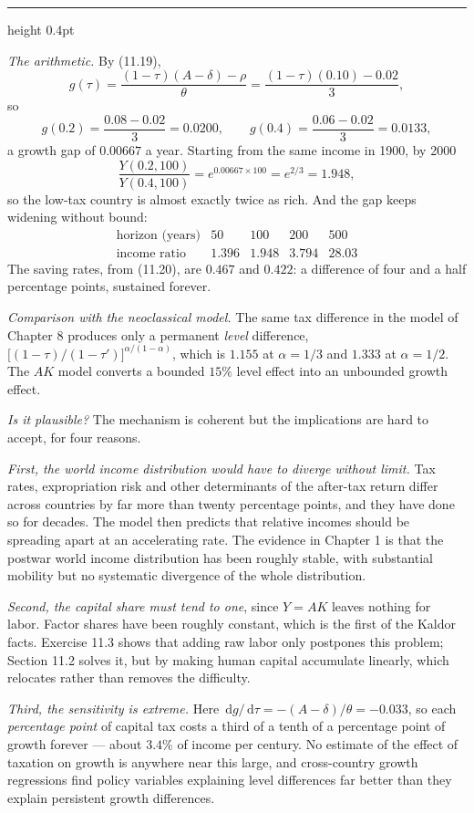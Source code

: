 \documentclass[11pt,letterpaper,reqno]{amsart}
\makeatletter
\newcommand{\dd}{\,\mathrm{d}}
\newcommand{\as@head}[3]{%
  \par\addvspace{1.6ex}\penalty-200\relax
  \phantomsection
  \addcontentsline{toc}{subsection}{#1 #2\texorpdfstring{\ifx\relax#3\relax\else\quad #3\fi}{}}%
  {\color{RuleGrey}\hrule height 0.4pt}%
  \nobreak\vspace{0.8ex}\nobreak
  \noindent{\bfseries #1 #2}%
  \ifx\relax#3\relax\else\quad{\bfseries\itshape #3}\fi
  \par\nobreak\vspace{0.4ex}\nobreak
  \as@beginstatement
}
\newcommand{\as@beginstatement}{\begingroup\itshape\ignorespaces}
\newenvironment{aex}[2]{\as@head{Exercise}{#1}{#2}}{\par\addvspace{1.2ex}}
\newcommand{\bk}[1]{\textup{\textsc{#1}}}
\renewcommand{\as@beginstatement}{\ignorespaces}
\makeatother
\begin{document}
\begin{aex}{11.7}{}
\emph{The arithmetic.}  By \bk{(11.19)},
\[
g(\tau)=\frac{(1-\tau)(A-\delta)-\rho}{\theta}=\frac{(1-\tau)(0.10)-0.02}{3} ,
\]
so
\[
g(0.2)=\frac{0.08-0.02}{3}=0.0200,
\qquad
g(0.4)=\frac{0.06-0.02}{3}=0.0133 ,
\]
a growth gap of $0.00667$ a year.  Starting from the same income in 1900, by 2000
\[
\frac{Y(0.2,100)}{Y(0.4,100)}=e^{0.00667\times100}=e^{2/3}=1.948 ,
\]
so the low-tax country is almost exactly twice as rich.  And the gap keeps widening without
bound:
\[
\begin{array}{ccccc}
\text{horizon (years)} & 50 & 100 & 200 & 500\\
\text{income ratio} & 1.396 & 1.948 & 3.794 & 28.03
\end{array}
\]
The saving rates, from \bk{(11.20)}, are $0.467$ and $0.422$: a difference of four and a half
percentage points, sustained forever.

\emph{Comparison with the neoclassical model.}  The same tax difference in the model of
Chapter 8 produces only a permanent \emph{level} difference,
$\bigl[(1-\tau)/(1-\tau')\bigr]^{\alpha/(1-\alpha)}$, which is $1.155$ at $\alpha=1/3$ and
$1.333$ at $\alpha=1/2$.  The $AK$ model converts a bounded $15\%$ level effect into an unbounded
growth effect.

\emph{Is it plausible?}  The mechanism is coherent but the implications are hard to accept, for
four reasons.

\emph{First, the world income distribution would have to diverge without limit.}  Tax rates,
expropriation risk and other determinants of the after-tax return differ across countries by far
more than twenty percentage points, and they have done so for decades.  The model then predicts
that relative incomes should be spreading apart at an accelerating rate.  The evidence in Chapter
1 is that the postwar world income distribution has been roughly stable, with substantial mobility
but no systematic divergence of the whole distribution.

\emph{Second, the capital share must tend to one}, since $Y=AK$ leaves nothing for labor.  Factor
shares have been roughly constant, which is the first of the Kaldor facts.  Exercise 11.3 shows
that adding raw labor only postpones this problem; Section 11.2 solves it, but by making human
capital accumulate linearly, which relocates rather than removes the difficulty.

\emph{Third, the sensitivity is extreme.}  Here $\dd g/\dd\tau=-(A-\delta)/\theta=-0.033$, so each
\emph{percentage point} of capital tax costs a third of a tenth of a percentage point of growth
forever --- about $3.4\%$ of income per century.  No estimate of the effect of taxation on growth
is anywhere near this large, and cross-country growth regressions find policy variables
explaining level differences far better than they explain persistent growth differences.


\end{aex}
\end{document}
